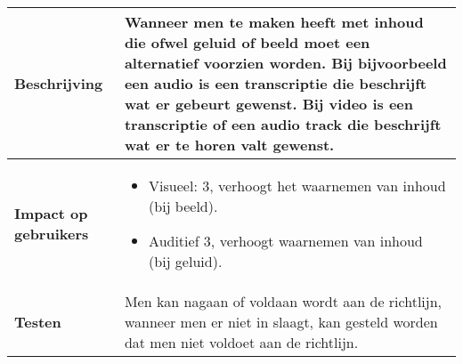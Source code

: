 \begin{table}[H]
\begin{tabular}{|l|p{12cm}|}
        \hline
        \textbf{Beschrijving}                & Wanneer men te maken heeft met inhoud die ofwel geluid of beeld moet een alternatief voorzien worden. Bij bijvoorbeeld een audio is een transcriptie die beschrijft wat er gebeurt gewenst. Bij video is een transcriptie of een audio track die beschrijft wat er te horen valt gewenst. \\ 
        \hline
        \textbf{Impact op gebruikers}        & 
        \begin{itemize}
            \item Visueel: 3, verhoogt het waarnemen van inhoud (bij beeld).
            \item Auditief 3, verhoogt waarnemen van inhoud (bij geluid).             
        \end{itemize}                                                                                                                   \\ 
        \hline
        \textbf{Testen}                      & Men kan nagaan of voldaan wordt aan de richtlijn, wanneer men er niet in slaagt, kan gesteld worden dat men niet voldoet aan de richtlijn.                                                                                                                                                                                                            \\
        \hline
    \end{tabular}
\end{table}
